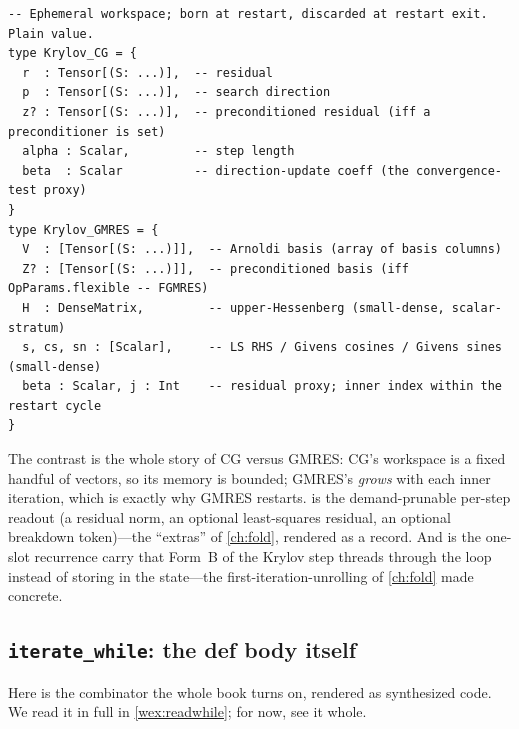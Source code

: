 \begin{lstlisting}[style=l4style]
-- Ephemeral workspace; born at restart, discarded at restart exit. Plain value.
type Krylov_CG = {
  r  : Tensor[(S: ...)],  -- residual
  p  : Tensor[(S: ...)],  -- search direction
  z? : Tensor[(S: ...)],  -- preconditioned residual (iff a preconditioner is set)
  alpha : Scalar,         -- step length
  beta  : Scalar          -- direction-update coeff (the convergence-test proxy)
}
type Krylov_GMRES = {
  V  : [Tensor[(S: ...)]],  -- Arnoldi basis (array of basis columns)
  Z? : [Tensor[(S: ...)]],  -- preconditioned basis (iff OpParams.flexible -- FGMRES)
  H  : DenseMatrix,         -- upper-Hessenberg (small-dense, scalar-stratum)
  s, cs, sn : [Scalar],     -- LS RHS / Givens cosines / Givens sines (small-dense)
  beta : Scalar, j : Int    -- residual proxy; inner index within the restart cycle
}
\end{lstlisting}
The contrast is the whole story of CG versus GMRES: CG's workspace is a fixed
handful of vectors, so its memory is bounded; GMRES's  \emph{grows} with
each inner iteration, which is exactly why GMRES restarts.  is
the demand-prunable per-step readout (a residual norm, an optional
least-squares residual, an optional breakdown token)---the ``extras'' of
\cref{ch:fold}, rendered as a record. And  is the one-slot
recurrence carry that Form~B of the Krylov step threads through the loop instead of
storing in the state---the first-iteration-unrolling of \cref{ch:fold} made
concrete.

\subsection{\texttt{iterate\_while}: the def body itself}

Here is the combinator the whole book turns on, rendered as synthesized code. We
read it in full in \cref{wex:readwhile}; for now, see it whole.

